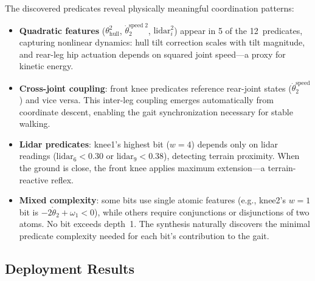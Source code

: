 \documentclass[9pt,a4paper]{article}
\theoremstyle{plain}
\theoremstyle{definition}
\theoremstyle{remark}
\begin{document}
The discovered predicates reveal physically meaningful coordination
patterns:

\begin{itemize}
\item \textbf{Quadratic features} ($\theta_\text{hull}^2$,
  $\dot\theta_2^{\text{speed}\;2}$, $\text{lidar}_i^2$)
  appear in 5 of the 12~predicates, capturing nonlinear dynamics:
  hull tilt correction scales with tilt magnitude, and rear-leg
  hip actuation depends on squared joint speed---a proxy for
  kinetic energy.

\item \textbf{Cross-joint coupling}: front knee predicates
  reference rear-joint states ($\dot\theta_2^\text{speed}$) and
  vice versa.  This inter-leg coupling emerges automatically from
  coordinate descent, enabling the gait synchronization necessary
  for stable walking.

\item \textbf{Lidar predicates}: knee1's highest bit ($w{=}4$)
  depends only on lidar readings ($\text{lidar}_6 < 0.30$ or
  $\text{lidar}_9 < 0.38$), detecting terrain proximity.
  When the ground is close, the front knee applies maximum
  extension---a terrain-reactive reflex.

\item \textbf{Mixed complexity}: some bits use single atomic
  features (e.g., knee2's $w{=}1$ bit is $-2 \dot\theta_2 +
  \omega_1 < 0$), while others require conjunctions or
  disjunctions of two atoms.  No bit exceeds depth~1.
  The synthesis naturally discovers the minimal predicate
  complexity needed for each bit's contribution to the gait.
\end{itemize}

\subsection{Deployment Results}
\end{document}
